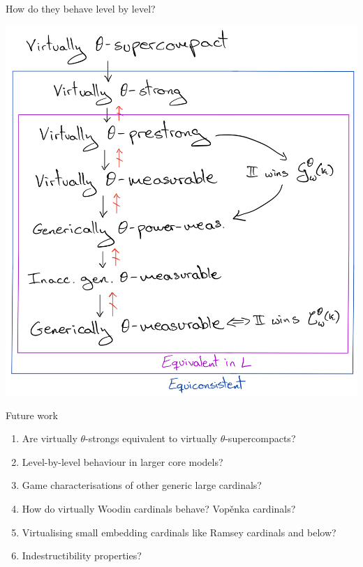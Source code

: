 \documentclass{beamer}
\begin{document}
\begin{frame}{How do they behave level by level?}
  \begin{center}
    \includegraphics[scale=.16]{gfx/lbl_virtual.jpg}
  \end{center}
\end{frame}

\begin{frame}{Future work}
  \begin{enumerate}
    \item Are virtually $\theta$-strongs equivalent to virtually $\theta$-supercompacts?
    \pause\item Level-by-level behaviour in larger core models?
    \pause\item Game characterisations of other generic large cardinals?
    \pause\item How do virtually Woodin cardinals behave? \pause Vop\v enka cardinals?
    \pause\item Virtualising small embedding cardinals like Ramsey cardinals and below?
    \pause\item Indestructibility properties?
  \end{enumerate}
\end{frame}
\end{document}
